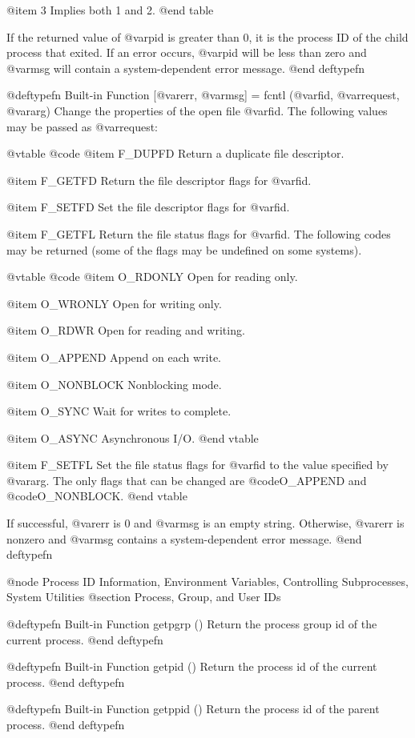 {{@item 3
Implies both 1 and 2.
@end table

If the returned value of @var{pid} is greater than 0, it is the process
ID of the child process that exited.  If an error occurs, @var{pid} will
be less than zero and @var{msg} will contain a system-dependent error
message.
@end deftypefn

@deftypefn {Built-in Function} {[@var{err}, @var{msg}] =} fcntl (@var{fid}, @var{request}, @var{arg})
Change the properties of the open file @var{fid}.  The following values
may be passed as @var{request}:

@vtable @code
@item F_DUPFD
Return a duplicate file descriptor.

@item F_GETFD
Return the file descriptor flags for @var{fid}.

@item F_SETFD
Set the file descriptor flags for @var{fid}.

@item F_GETFL
Return the file status flags for @var{fid}.  The following codes may be
returned (some of the flags may be undefined on some systems).

@vtable @code
@item O_RDONLY
Open for reading only.

@item O_WRONLY
Open for writing only.

@item O_RDWR
Open for reading and writing.

@item O_APPEND
Append on each write.

@item O_NONBLOCK
Nonblocking mode.

@item O_SYNC
Wait for writes to complete.

@item O_ASYNC
Asynchronous I/O.
@end vtable

@item F_SETFL
Set the file status flags for @var{fid} to the value specified by
@var{arg}.  The only flags that can be changed are @code{O_APPEND} and
@code{O_NONBLOCK}.
@end vtable

If successful, @var{err} is 0 and @var{msg} is an empty string.
Otherwise, @var{err} is nonzero and @var{msg} contains a
system-dependent error message.
@end deftypefn

@node Process ID Information, Environment Variables, Controlling Subprocesses, System Utilities
@section Process, Group, and User IDs

@deftypefn {Built-in Function} {} getpgrp ()
Return the process group id of the current process.
@end deftypefn

@deftypefn {Built-in Function} {} getpid ()
Return the process id of the current process.
@end deftypefn

@deftypefn {Built-in Function} {} getppid ()
Return the process id of the parent process.
@end deftypefn

}}
